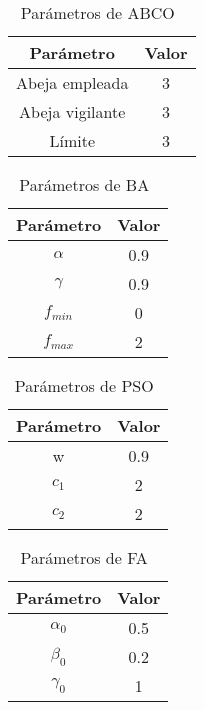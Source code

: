 \begin{table}[H]
    \centering
    \begin{tabular}{ c c }
        \hline
        \textbf{Parámetro} & \textbf{Valor} \\
        \hline
        Abeja empleada     & 3              \\
        Abeja vigilante    & 3              \\
        Límite             & 3              \\
        \hline
    \end{tabular}
    \caption{Parámetros de ABCO~\cite{karaboga_idea_nodate}}
\end{table}

\begin{table}[H]
    \centering
    \begin{tabular}{ c c }
        \hline
        \textbf{Parámetro} & \textbf{Valor} \\
        \hline
        $\alpha$           & 0.9            \\
        $\gamma $          & 0.9            \\
        $f_{min}$          & 0              \\
        $f_{max}$          & 2             \\
        \hline
    \end{tabular}
    \caption{Parámetros de BA~\cite{mirjalili_binary_2014}}
\end{table}

\begin{table}[H]
    \centering
    \begin{tabular}{ c c }
        \hline
        \textbf{Parámetro} & \textbf{Valor} \\
        \hline
        w                  & 0.9            \\
        $c_1$              & 2              \\
        $c_2$              & 2              \\
        \hline
    \end{tabular}
    \caption{Parámetros de PSO~\cite{mirjalili_s-shaped_2013}}
\end{table}

\begin{table}[H]
    \centering
    \begin{tabular}{ c c }
        \hline
        \textbf{Parámetro} & \textbf{Valor} \\
        \hline
        $\alpha_0$         & 0.5           \\
        $\beta_0$          & 0.2            \\
        $\gamma_0$         & 1              \\
        \hline
    \end{tabular}
    \caption{Parámetros de FA~\cite{zhang2016optimal}}
\end{table}

